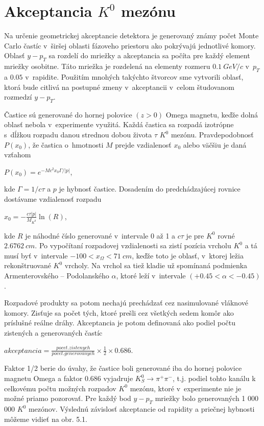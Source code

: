 \section{Akceptancia $K^{0}$ mezónu}
Na určenie geometrickej akceptancie detektora je generovaný známy počet Monte
Carlo častíc v~širšej oblasti fázoveho priestoru ako pokrývajú
jednotlivé komory. Oblasť $y-p_{T}$ sa rozdelí do mriežky a akceptancia
sa počíta pre každý element mriežky osobitne. Táto mriežka je rozdelená na
elementy rozmeru $0.1\: GeV/c$ v~$p_{T}$ a $0.05$ v~rapidite. Použitím
mnohých takýchto štvorcov sme vytvorili oblasť, ktorá bude citlivá na
postupné zmeny v~akceptancii v~celom študovanom rozmedzí $y-p_{T}$.

Častice sú generované do hornej polovice $(z>0)$ Omega magnetu, keďže
dolná oblasť nebola v~experimente využitá.  Každá častica sa rozpadá
izotrópne s~dĺžkou rozpadu danou
strednou dobou života $\tau$ $K^{0}$ mezónu. Pravdepodobnosť $P(x_{0})$, že
častica o~hmotnosti $M$ prejde vzdialenosť $x_{0}$  alebo väčšiu je daná
vzťahom
\begin{center}
  $P(x_{0})=e^{-Mc^{2}x_{0}\Gamma/|p|}$,
\end{center}
kde $\Gamma = 1 / c\tau$ a $p$ je hybnosť častice. Dosadením do
predchádzajúcej rovnice dostávame vzdialenosť rozpadu
\begin{center}
  $x_{0}=-\frac{c\tau |p|}{M_{K^{0}}}\ln(R)$,
\end{center}
kde $R$ je náhodné číslo generované v~intervale 0 až 1 a $c\tau$ je pre
$K^{0}$ rovné $2.6762~cm$. Po vypočítaní rozpadovej vzdialenosti sa zistí
pozícia vrcholu $K^{0}$ a tá musí byť v~intervale $-100<x_{\Omega}<71\: cm$,
keďže toto je oblasť, v~ktorej ležia rekonštruované $K^{0}$ vrcholy.
Na vrchol sa tiež kladie už spomínaná podmienka Armenterovského --
Podolanského $\alpha$, ktoré leží v~intervale $(+0.45<\alpha<-0.45)$.

Rozpadové produkty  sa potom nechajú prechádzať cez nasimulované vláknové
komory. Zisťuje sa počet tých, ktoré prešli cez všetkých sedem komôr  ako
príslušné reálne dráhy.
Akceptancia je potom definovaná ako podiel počtu zistených a generovaných
častíc
\begin{center}
  $akceptancia=\frac{pocet.zistenych}{pocet.generovanych} \times \frac{1}{2}
  \times 0.686$.
\end{center}
Faktor 1/2  berie do úvahy, že častice boli generované iba do hornej
polovice magnetu Omega a faktor 0.686 vyjadruje  
$K^{0}_{S} \longrightarrow \pi^{+} \pi^{-}$, t.j. podiel tohto kanálu k
celkovému počtu možných rozpadov  $K^{0}$ mezónu, ktoré v~experimente nie je
možné priamo pozorovať. Pre každý bod  $y-p_{T}$ mriežky bolo generovaných
1 000 000 $K^{0}$ mezónov. Výslednú závislosť akceptancie od rapidity a
priečnej hybnosti môžeme vidieť na obr. 5.1.

